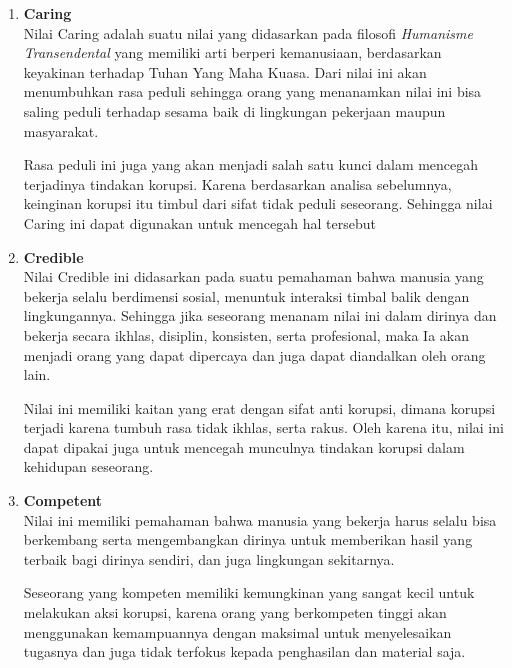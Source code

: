 \documentclass[11pt]{article}
\begin{document}
\begin{enumerate}
    \item \textbf{Caring} \\
          Nilai Caring adalah suatu nilai yang didasarkan pada filosofi
          \emph{Humanisme Transendental} yang memiliki arti berperi kemanusiaan,
          berdasarkan keyakinan terhadap Tuhan Yang Maha Kuasa. Dari nilai ini 
          akan menumbuhkan rasa peduli sehingga orang yang menanamkan nilai ini 
          bisa saling peduli terhadap sesama baik di lingkungan pekerjaan maupun 
          masyarakat.
          
          Rasa peduli ini juga yang akan menjadi salah satu kunci 
          dalam mencegah terjadinya tindakan korupsi. Karena berdasarkan analisa
          sebelumnya, keinginan korupsi itu timbul dari sifat tidak peduli seseorang.
          Sehingga nilai Caring ini dapat digunakan untuk mencegah hal tersebut

    \item \textbf{Credible} \\
          Nilai Credible ini didasarkan pada suatu pemahaman bahwa manusia yang
          bekerja selalu berdimensi sosial, menuntuk interaksi timbal balik dengan
          lingkungannya. Sehingga jika seseorang menanam nilai ini dalam dirinya
          dan bekerja secara ikhlas, disiplin, konsisten, serta profesional, maka
          Ia akan menjadi orang yang dapat dipercaya dan juga dapat diandalkan
          oleh orang lain. 

          Nilai ini memiliki kaitan yang erat dengan sifat anti korupsi, dimana
          korupsi terjadi karena tumbuh rasa tidak ikhlas, serta rakus. Oleh karena
          itu, nilai ini dapat dipakai juga untuk mencegah munculnya tindakan korupsi
          dalam kehidupan seseorang.

    \item \textbf{Competent} \\
            Nilai ini memiliki pemahaman bahwa manusia yang bekerja harus selalu 
            bisa berkembang serta mengembangkan dirinya untuk memberikan hasil yang
            terbaik bagi dirinya sendiri, dan juga lingkungan sekitarnya.

            Seseorang yang kompeten memiliki kemungkinan yang sangat kecil untuk
            melakukan aksi korupsi, karena orang yang berkompeten tinggi akan 
            menggunakan kemampuannya dengan maksimal untuk menyelesaikan tugasnya
            dan juga tidak terfokus kepada penghasilan dan material saja.


\end{enumerate}
\end{document}
